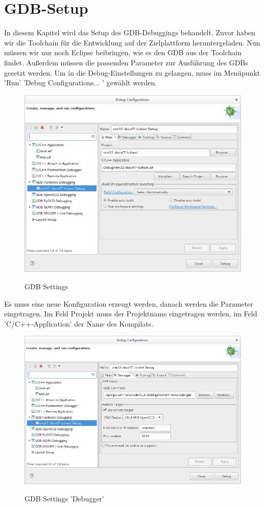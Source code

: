 \section{GDB-Setup}
In diesem Kapitel wird das Setup des GDB-Debuggings behandelt. Zuvor haben wir die Toolchain für die Entwicklung auf der Zielplattform heruntergeladen. Nun müssen wir nur noch Eclipse beibringen, wie es den GDB aus der Toolchain findet. Außerdem müssen die passenden Parameter zur Ausführung des GDBs gesetzt werden.
Um in die Debug-Einstellungen zu gelangen, muss im Menüpunkt 'Run' 'Debug Configurations... ' gewählt werden. 
\begin{figure}[h]
\begin{center}
\includegraphics[width=12cm]{grafiken/debugger/GDBsetting1.png}
\label{ecplipse_GDB_setting1}
\caption{GDB Settings}
\end{center}
\end{figure}
Es muss eine neue Konfiguration erzeugt werden, danach werden die Parameter eingetragen. Im Feld Projekt muss der Projektname eingetragen werden, im Feld 'C/C++-Application' der Name des Kompilats.
\begin{figure}[h]
\begin{center}
\includegraphics[width=12cm]{grafiken/debugger/GDBsetting2.png}
\label{ecplipse_GDB_setting2}
\caption{GDB Settings 'Debugger'}
\end{center}
\end{figure}
